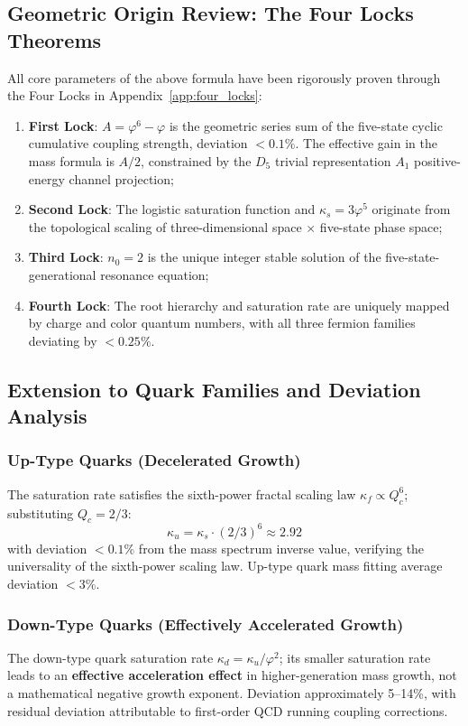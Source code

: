 \documentclass[12pt,a4paper,twocolumn]{article}
\renewcommand{\phi}{\varphi}
\begin{document}
\subsection{Geometric Origin Review: The Four Locks Theorems}
All core parameters of the above formula have been rigorously proven through the Four Locks in Appendix~\ref{app:four_locks}:
\begin{enumerate}
\item \textbf{First Lock}: $A = \phi^6-\phi$ is the geometric series sum of the five-state cyclic cumulative coupling strength, deviation $<0.1\%$. The effective gain in the mass formula is $A/2$, constrained by the $D_5$ trivial representation $A_1$ positive-energy channel projection;
\item \textbf{Second Lock}: The logistic saturation function and $\kappa_s = 3\phi^5$ originate from the topological scaling of three-dimensional space $\times$ five-state phase space;
\item \textbf{Third Lock}: $n_0 = 2$ is the unique integer stable solution of the five-state-generational resonance equation;
\item \textbf{Fourth Lock}: The root hierarchy and saturation rate are uniquely mapped by charge and color quantum numbers, with all three fermion families deviating by $<0.25\%$.
\end{enumerate}

\subsection{Extension to Quark Families and Deviation Analysis}
\subsubsection{Up-Type Quarks (Decelerated Growth)}
The saturation rate satisfies the sixth-power fractal scaling law $\kappa_f \propto Q_c^6$; substituting $Q_c = 2/3$:
\[
\kappa_u = \kappa_s \cdot (2/3)^6 \approx 2.92
\]
with deviation $<0.1\%$ from the mass spectrum inverse value, verifying the universality of the sixth-power scaling law. Up-type quark mass fitting average deviation $<3\%$.

\subsubsection{Down-Type Quarks (Effectively Accelerated Growth)}
The down-type quark saturation rate $\kappa_d = \kappa_u/\phi^2$; its smaller saturation rate leads to an \textbf{effective acceleration effect} in higher-generation mass growth, not a mathematical negative growth exponent. Deviation approximately 5--14\%, with residual deviation attributable to first-order QCD running coupling corrections.
\end{document}
